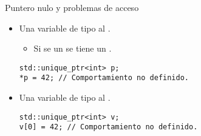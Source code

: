 \begin{frame}[t,fragile]{Puntero nulo y problemas de acceso}
\begin{itemize}
  \item Una variable de tipo  
         al .
    \begin{itemize}
      \item Si se  un  se tiene un 
            .
    \end{itemize}
\begin{lstlisting}
std::unique_ptr<int> p;
*p = 42; // Comportamiento no definido.
\end{lstlisting}

  \item Una variable de tipo 
         al .
\begin{lstlisting}
std::unique_ptr<int> v;
v[0] = 42; // Comportamiento no definido.
\end{lstlisting}
\end{itemize}
\end{frame}

